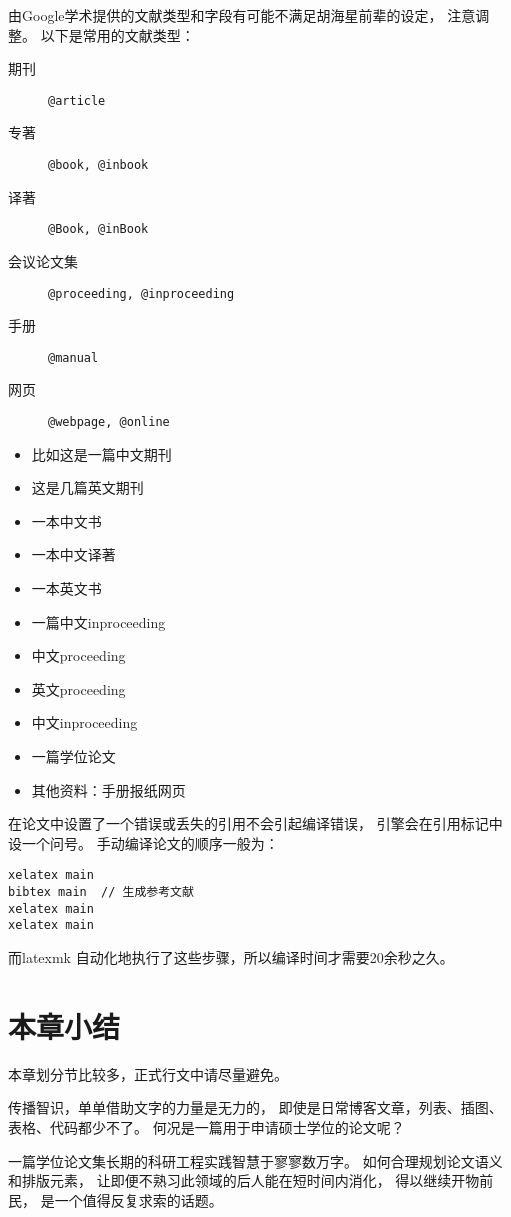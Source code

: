 由Google学术提供的文献类型和字段有可能不满足胡海星前辈的设定，
注意调整。
以下是常用的文献类型：
\begin{description}
    \item[期刊]          \texttt{@article}
    \item[专著]          \texttt{@book, @inbook}
    \item[译著]          \texttt{@Book, @inBook}
    \item[会议论文集]    \texttt{@proceeding, @inproceeding}
    \item[手册]          \texttt{@manual}
    \item[网页]          \texttt{@webpage, @online}
\end{description}

\begin{itemize}
    \item 比如这是一篇中文期刊\cite{lixiaodong1999}
    \item 这是几篇英文期刊\cite{christine1998, kanamori1998}
    \item 一本中文书\cite{zh-book-1}
    \item 一本中文译著\cite{anwen1988b}
    \item 一本英文书\cite{lamport1994latex, takeuti1973}
    \item 一篇中文inproceeding\cite{nonlinear1996}
    \item 中文proceeding\cite{a2-1}
    \item 英文proceeding\cite{a2-2}
    \item 中文inproceeding\cite{aczel1998}
    \item 一篇学位论文\cite{a4-1} 
    \item 其他资料：手册\cite{ipad}报纸\cite{renminribao}网页\cite{dubash2010}
\end{itemize}

在论文中设置了一个错误或丢失的引用不会引起编译错误，
引擎会在引用标记中设一个问号。
手动编译论文的顺序一般为：
\begin{verbatim}
xelatex main
bibtex main  // 生成参考文献
xelatex main
xelatex main
\end{verbatim}
而latexmk 自动化地执行了这些步骤，所以编译时间才需要20余秒之久。







\section{本章小结}

本章划分节比较多，正式行文中请尽量避免。

传播智识，单单借助文字的力量是无力的，
即使是日常博客文章，列表、插图、表格、代码都少不了。
何况是一篇用于申请硕士学位的论文呢？

一篇学位论文集长期的科研工程实践智慧于寥寥数万字。
如何合理规划论文语义和排版元素，
让即便不熟习此领域的后人能在短时间内消化，
得以继续开物前民，
是一个值得反复求索的话题。

